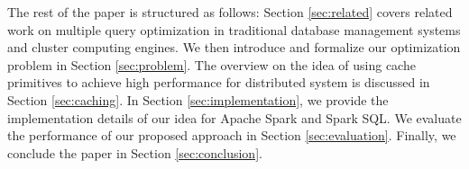 The rest of the paper is structured as follows:  Section \ref{sec:related} covers related work on multiple query optimization in traditional database management systems and cluster computing engines. We then introduce and formalize our optimization problem in Section \ref{sec:problem}. The overview on the idea of using cache primitives to achieve high performance for distributed system is discussed in Section \ref{sec:caching}. In Section \ref{sec:implementation}, we provide the implementation details of our idea for Apache Spark and Spark SQL. We evaluate the performance of our proposed approach in Section \ref{sec:evaluation}. Finally, we conclude the paper in Section \ref{sec:conclusion}.